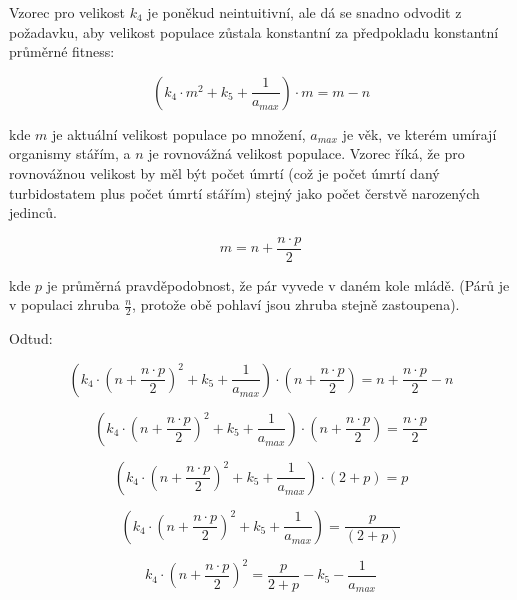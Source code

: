 \begin{tcolorbox}[ title={Odvození vzorce pro $k_4$}
                 , breakable
                 ]

Vzorec pro velikost $k_4$ je poněkud neintuitivní, ale dá se snadno odvodit z požadavku, aby velikost populace zůstala
konstantní za předpokladu konstantní průměrné fitness:

\begin{equation}
(k_4\cdot{m^2} + {k_5} + \frac{1}{a_{max}})\cdot{m} = m - n
\end{equation}

kde $m$ je aktuální velikost populace po množení, $a_{max}$ je věk, ve kterém umírají organismy stářím, a $n$ je rovnovážná
velikost populace. Vzorec říká, že pro rovnovážnou velikost by měl být počet úmrtí (což je počet úmrtí daný
turbidostatem plus počet úmrtí stářím) stejný jako počet čerstvě narozených jedinců.

\begin{equation}
m = n + \frac{n\cdot{}p}{2}
\end{equation}

kde $p$ je průměrná pravděpodobnost, že pár vyvede v daném kole mládě. (Párů je v populaci zhruba $\frac{n}{2}$, protože
obě pohlaví jsou zhruba stejně zastoupena).

Odtud:

\begin{equation}
(k_4\cdot{(n + \frac{n\cdot{}p}{2})^2} + {k_5} + \frac{1}{a_{max}})\cdot{(n + \frac{n\cdot{}p}{2})}
        = n + \frac{n\cdot{}p}{2}  - n
\end{equation}

\begin{equation}
(k_4\cdot{(n + \frac{n\cdot{}p}{2})^2} + {k_5} + \frac{1}{a_{max}})\cdot{(n + \frac{n\cdot{}p}{2})} = \frac{n\cdot{}p}{2}
\end{equation}

\begin{equation}
(k_4\cdot{(n + \frac{n\cdot{}p}{2})^2} + {k_5} + \frac{1}{a_{max}})\cdot{(2 + p)} = p
\end{equation}


\begin{equation}
(k_4\cdot{(n + \frac{n\cdot{}p}{2})^2} + {k_5} + \frac{1}{a_{max}}) = \frac{p}{(2 + p)}
\end{equation}

\begin{equation}
k_4\cdot{(n + \frac{n\cdot{}p}{2})^2} = \frac{p}{2 + p} -  {k_5} - \frac{1}{a_{max}}
\end{equation}


\end{tcolorbox}
